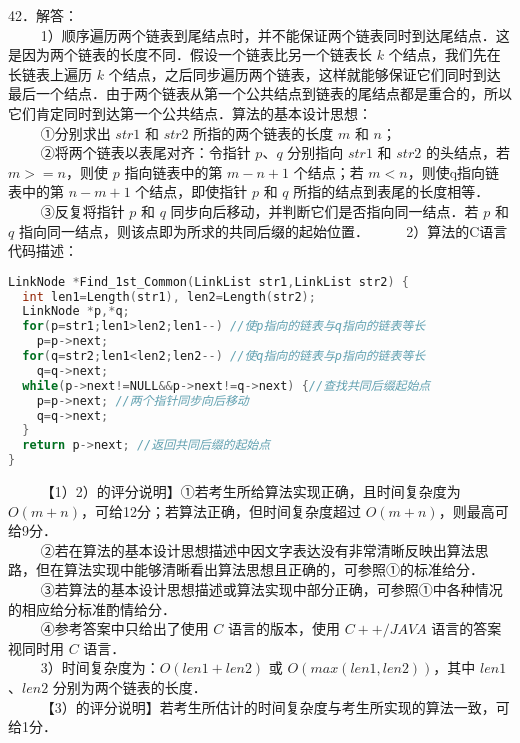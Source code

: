 42．解答：\\
$\qquad$ 1）顺序遍历两个链表到尾结点时，并不能保证两个链表同时到达尾结点．这是因为两个链表的长度不同．假设一个链表比另一个链表长 $k$ 个结点，我们先在长链表上遍历 $k$ 个结点，之后同步遍历两个链表，这样就能够保证它们同时到达最后一个结点．由于两个链表从第一个公共结点到链表的尾结点都是重合的，所以它们肯定同时到达第一个公共结点．算法的基本设计思想：\\
$\qquad$ ①分别求出 $str1$ 和 $str2$ 所指的两个链表的长度 $m$ 和 $n$；\\
$\qquad$ ②将两个链表以表尾对齐：令指针 $p$、$q$ 分别指向 $str1$ 和 $str2$ 的头结点，若 $m>=n$，则使 $p$ 指向链表中的第 $m-n+1$ 个结点；若 $m<n$，则使q指向链表中的第 $n-m+1$ 个结点，即使指针 $p$ 和 $q$ 所指的结点到表尾的长度相等．\\
$\qquad$ ③反复将指针 $p$ 和 $q$ 同步向后移动，并判断它们是否指向同一结点．若 $p$ 和 $q$ 指向同一结点，则该点即为所求的共同后缀的起始位置．
$\qquad$ 2）算法的C语言代码描述：\\
\begin{lstlisting}[language=cpp]
LinkNode *Find_1st_Common(LinkList str1,LinkList str2) {
  int len1=Length(str1), len2=Length(str2);
  LinkNode *p,*q;
  for(p=str1;len1>len2;len1--) //使p指向的链表与q指向的链表等长
    p=p->next;
  for(q=str2;len1<len2;len2--) //使q指向的链表与p指向的链表等长
    q=q->next;
  while(p->next!=NULL&&p->next!=q->next) {//查找共同后缀起始点
    p=p->next; //两个指针同步向后移动
    q=q->next;
  }
  return p->next; //返回共同后缀的起始点
}
\end{lstlisting}
$\qquad$ 【1）2）的评分说明】①若考生所给算法实现正确，且时间复杂度为 $O(m+n)$，可给12分；若算法正确，但时间复杂度超过 $O(m+n)$，则最高可给9分．\\
$\qquad$ ②若在算法的基本设计思想描述中因文字表达没有非常清晰反映出算法思路，但在算法实现中能够清晰看出算法思想且正确的，可参照①的标准给分．\\
$\qquad$ ③若算法的基本设计思想描述或算法实现中部分正确，可参照①中各种情况的相应给分标准酌情给分．\\
$\qquad$ ④参考答案中只给出了使用 $C$ 语言的版本，使用 $C++/JAVA$ 语言的答案视同时用 $C$ 语言．\\
$\qquad$ 3）时间复杂度为：$O(len1+len2)$ 或 $O(max(len1,len2))$，其中 $len1$、$len2$ 分别为两个链表的长度．\\
$\qquad$ 【3）的评分说明】若考生所估计的时间复杂度与考生所实现的算法一致，可给1分．

